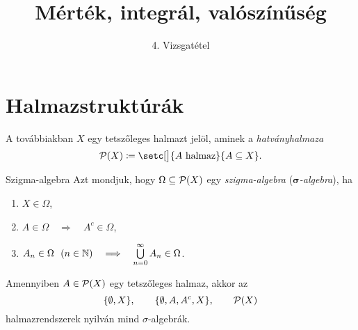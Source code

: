 \documentclass[
]{elteikthesis}[2024/04/26]
\title{Mérték, integrál, valószínűség} %
\subtitle{4. Vizsgatétel}
\begin{document}
	
	
	\section{Halmazstruktúrák}
	
	A továbbiakban \( X \) egy tetszőleges halmazt jelöl, aminek a \emph{hatványhalmaza}
	\[
		\powerset{X} \coloneq \setc[\big]{A \text{ halmaz}}{A \subseteq X}.
	\]
	
	\begin{definition}{Szigma-algebra}{}
		Azt mondjuk, hogy \( \Omega \subseteq \mathcal{P}( X ) \) egy \emph{szigma-algebra} 
		(\emph{\( \boldsymbol{\sigma} \)-algebra}), ha
		\begin{enumerate}[label={(\( \Sigma \)\arabic*)}, ref={\( \Sigma \)\arabic*.}]
			\item\label{ax:sigma-algebra-01}
			\( X \in \Omega \),
			
			\item\label{ax:sigma-algebra-02}
			\( A \in \Omega \quad \Longrightarrow \quad A^c \in \Omega \),
			
			\item\label{ax:sigma-algebra-03}
			\( A_n \in \Omega \ \ (n \in \mathbb{N}) 
			   \quad \Longrightarrow \quad 
			   \bigcup\limits_{n=0}^{\infty} A_n \in \Omega 
			\).
		\end{enumerate}
	\end{definition}
	
	\begin{example}
		Amennyiben \( A \in \mathcal{P}( X ) \) egy tetszőleges halmaz, akkor az
		\[
			\{ \emptyset, X \}, \qquad \{ \emptyset, A, A^c, X \}, \qquad \mathcal{P}( X )
		\]
		halmazrendszerek nyilván mind \( \sigma \)-algebrák. 
	\end{example}
	
\end{document}
